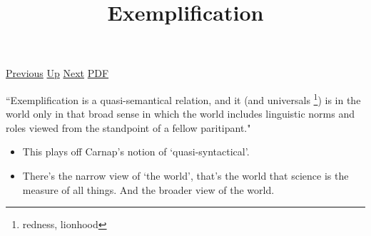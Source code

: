 \documentclass[12pt,a4paper]{report}
\begin{document}
 \href{doc/phil/People/Sellars/Quotes/Describingtheworldwithoutmodality.html}{Previous} 
 \href{doc/phil/People/Sellars/Quotes.html}{Up} 
 \href{doc/phil/People/Sellars/Quotes/Issemanticspsychological.html}{Next} 
 \href{doc/phil/People/Sellars/Quotes/Exemplification.pdf}{PDF} 
\title{Exemplification}
``Exemplification is a quasi-semantical relation, and it (and universals
\footnote{redness, lionhood}) is in the world only in that broad sense in which the
world includes linguistic norms and roles viewed from the standpoint of a
fellow paritipant."

\begin{itemize}
    \item This plays off Carnap's notion of `quasi-syntactical'.
    \item There's the narrow view of `the world', that's the world that science
          is the measure of all things. And the broader view of the world.
\end{itemize}
\end{document}
